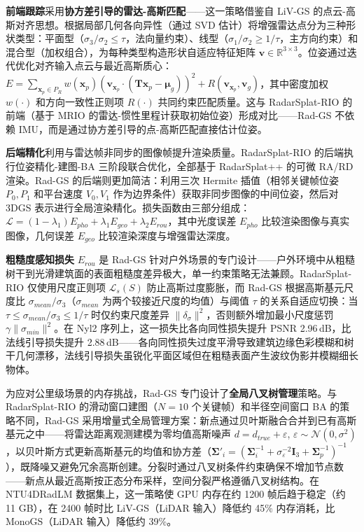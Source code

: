 \textbf{前端跟踪}采用\textbf{协方差引导的雷达-高斯匹配}——这一策略借鉴自 LiV-GS 的点云-高斯对齐思想。根据局部几何各向异性（通过 SVD 估计）将增强雷达点分为三种形状类型：平面型（$\sigma_3/\sigma_2 \leq \tau$，法向量约束）、线型（$\sigma_1/\sigma_2 \geq 1/\tau$，主方向约束）和混合型（加权组合），为每种类型构造形状自适应特征矩阵 $\mathbf{v} \in \mathbb{R}^{3 \times 3}$。位姿通过迭代优化对齐输入点云与最近高斯质心：$E = \sum_{\mathbf{x}_p \in P_R} w(\mathbf{x}_p)(\mathbf{v}_{\mathbf{x}_p} \cdot (\mathbf{T} \mathbf{x}_p - \boldsymbol{\mu}_g))^2 + R(\mathbf{v}_{\mathbf{x}_p}, \mathbf{v}_g)$，其中密度加权 $w(\cdot)$ 和方向一致性正则项 $R(\cdot)$ 共同约束匹配质量。这与 RadarSplat-RIO 的前端（基于 MRIO 的雷达-惯性里程计获取初始位姿）形成对比——Rad-GS 不依赖 IMU，而是通过协方差引导的点-高斯匹配直接估计位姿。

\textbf{后端精化}利用与雷达帧非同步的图像帧提升渲染质量。RadarSplat-RIO 的后端执行位姿精化-建图-BA 三阶段联合优化，全部基于 RadarSplat++ 的可微 RA/RD 渲染。Rad-GS 的后端则更加简洁：利用三次 Hermite 插值（相邻关键帧位姿 $P_0, P_1$ 和平台速度 $V_0, V_1$ 作为边界条件）获取非同步图像的中间位姿，然后对 3DGS 表示进行全局渲染精化。损失函数由三部分组成：$\mathcal{L} = (1-\lambda_1)E_{pho} + \lambda_1 E_{geo} + \lambda_2 E_{rou}$，其中光度误差 $E_{pho}$ 比较渲染图像与真实图像，几何误差 $E_{geo}$ 比较渲染深度与增强雷达深度。

\textbf{粗糙度感知损失} $E_{rou}$ 是 Rad-GS 针对户外场景的专门设计——户外环境中从粗糙树干到光滑建筑面的表面粗糙度差异极大，单一约束策略无法兼顾。RadarSplat-RIO 仅使用尺度正则项 $\mathcal{L}_s(S)$ 防止高斯过度膨胀，而 Rad-GS 根据高斯基元尺度比 $\sigma_{mean}/\sigma_3$（$\sigma_{mean}$ 为两个较接近尺度的均值）与阈值 $\tau$ 的关系自适应切换：当 $\tau \leq \sigma_{mean}/\sigma_3 \leq 1/\tau$ 时仅约束尺度差异 $\|\delta_\sigma\|^2$，否则额外增加最小尺度惩罚 $\gamma\|\sigma_{min}\|^2$。在 Nyl2 序列上，这一损失比各向同性损失提升 PSNR 2.96\,dB，比法线引导损失提升 2.88\,dB——各向同性损失过度平滑导致建筑边缘色彩模糊和树干几何漂移，法线引导损失虽锐化平面区域但在粗糙表面产生波纹伪影并模糊细长物体。

为应对公里级场景的内存挑战，Rad-GS 专门设计了\textbf{全局八叉树管理}策略。与 RadarSplat-RIO 的滑动窗口建图（$N=10$ 个关键帧）和半径空间窗口 BA 的策略不同，Rad-GS 采用增量式全局管理方案：新点通过贝叶斯融合合并到已有高斯基元之中——将雷达距离观测建模为零均值高斯噪声 $d = d_{true} + \varepsilon$, $\varepsilon \sim \mathcal{N}(0, \sigma^2)$，以贝叶斯方式更新高斯基元的均值和协方差（$\bm{\Sigma}'_i = (\bm{\Sigma}_i^{-1} + \sigma_\varepsilon^{-2}\mathbf{I}_3 + \bm{\Sigma}_p^{-1})^{-1}$），既降噪又避免冗余高斯创建。分裂时通过八叉树条件约束确保不增加节点数——新点从最近高斯按正态分布采样，空间分裂严格遵循八叉树结构。在 NTU4DRadLM 数据集上，这一策略使 GPU 内存在约 1200 帧后趋于稳定（约 11 GB），在 2400 帧时比 LiV-GS（LiDAR 输入）降低约 45\% 内存消耗，比 MonoGS（LiDAR 输入）降低约 39\%。

